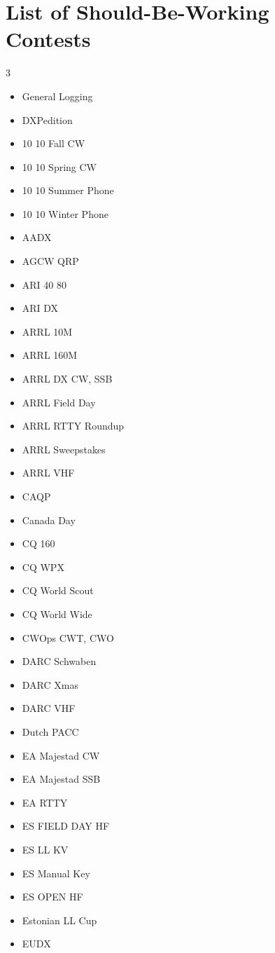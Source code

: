 \documentclass{article}
\begin{document}
\section{List of Should-Be-Working Contests}
\begin{multicols}{3}
\begin{itemize}
    \item General Logging
    \item DXPedition
    \item 10 10 Fall CW
    \item 10 10 Spring CW
    \item 10 10 Summer Phone
    \item 10 10 Winter Phone
    \item AADX
    \item AGCW QRP
    \item ARI 40 80
    \item ARI DX
    \item ARRL 10M
    \item ARRL 160M
    \item ARRL DX CW, SSB
    \item ARRL Field Day
    \item ARRL RTTY Roundup
    \item ARRL Sweepstakes
    \item ARRL VHF
    \item CAQP
    \item Canada Day
    \item CQ 160
    \item CQ WPX
    \item CQ World Scout
    \item CQ World Wide
    \item CWOps CWT, CWO
    \item DARC Schwaben
    \item DARC Xmas
    \item DARC VHF
    \item Dutch PACC
    \item EA Majestad CW
    \item EA Majestad SSB
    \item EA RTTY
    \item ES FIELD DAY HF
    \item ES LL KV
    \item ES Manual Key
    \item ES OPEN HF
    \item Estonian LL Cup
    \item EUDX

\end{itemize}
\end{multicols}
\end{document}
